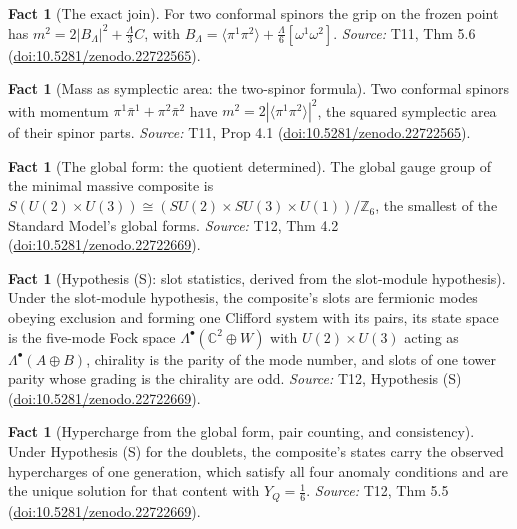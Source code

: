 \documentclass[11pt]{article}
\theoremstyle{definition}
\newtheorem{fact}[theorem]{Fact}
\theoremstyle{plain}
\newcommand{\changedmark}[2]{\marginpar{\raggedright\scriptsize\color{#1}#2}}
\providecommand{\C}{}\renewcommand{\C}{\mathbb{C}}
\providecommand{\br}{}\renewcommand{\br}[1]{\langle #1\rangle}
\begin{document}
\begin{fact}[The exact join]\label{c:mass.exact-join}
\changedmark{BurntOrange}{changed since the deposit}
For two conformal spinors the grip on the frozen point has $m^{2} = 2|B_{\Lambda}|^{2} + \tfrac{\Lambda}{3}C$, with $B_{\Lambda} = \br{\pi^{1}\pi^{2}} + \tfrac{\Lambda}{6}[\omega^{1}\omega^{2}]$.
\emph{Source:} T11, Thm 5.6 (\href{https://doi.org/10.5281/zenodo.22722565}{doi:10.5281/zenodo.22722565}).
\end{fact}

\begin{fact}[Mass as symplectic area: the two-spinor formula]\label{c:mass.mass-symplectic-area-two-twistor-formula}
Two conformal spinors with momentum $\pi^{1}\bar\pi^{1} + \pi^{2}\bar\pi^{2}$ have $m^{2} = 2|\br{\pi^{1}\pi^{2}}|^{2}$, the squared symplectic area of their spinor parts.
\emph{Source:} T11, Prop 4.1 (\href{https://doi.org/10.5281/zenodo.22722565}{doi:10.5281/zenodo.22722565}).
\end{fact}

\begin{fact}[The global form: the quotient determined]\label{c:standard-model.global-form-quotient-determined}
The global gauge group of the minimal massive composite is $S(U(2) \times U(3)) \cong (SU(2) \times SU(3) \times U(1))/\mathbb{Z}_{6}$, the smallest of the Standard Model's global forms.
\emph{Source:} T12, Thm 4.2 (\href{https://doi.org/10.5281/zenodo.22722669}{doi:10.5281/zenodo.22722669}).
\end{fact}

\begin{fact}[Hypothesis (S): slot statistics, derived from the slot-module hypothesis]\label{c:standard-model.hyp-s-slot-statistics}
Under the slot-module hypothesis, the composite's slots are fermionic modes obeying exclusion and forming one Clifford system with its pairs, its state space is the five-mode Fock space $\Lambda^{\bullet}(\C^{2} \oplus W)$ with $U(2) \times U(3)$ acting as $\Lambda^{\bullet}(A \oplus B)$, chirality is the parity of the mode number, and slots of one tower parity whose grading is the chirality are odd.
\emph{Source:} T12, Hypothesis (S) (\href{https://doi.org/10.5281/zenodo.22722669}{doi:10.5281/zenodo.22722669}).
\end{fact}

\begin{fact}[Hypercharge from the global form, pair counting, and consistency]\label{c:standard-model.hypercharge-global-form-pair-counting-consistency}
Under Hypothesis (S) for the doublets, the composite's states carry the observed hypercharges of one generation, which satisfy all four anomaly conditions and are the unique solution for that content with $Y_{Q} = \tfrac16$.
\emph{Source:} T12, Thm 5.5 (\href{https://doi.org/10.5281/zenodo.22722669}{doi:10.5281/zenodo.22722669}).
\end{fact}
\end{document}

